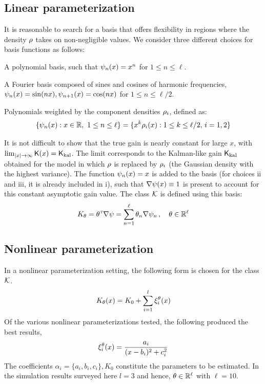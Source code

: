 \subsection*{Linear parameterization}
\label{s:linear_param}
It is reasonable to search for a basis that offers flexibility in regions where the density $\rho$ takes on non-negligible values. We consider three different choices for basis functions as follows:
\begin{romannum}
\item A polynomial basis, such that $\psi_n(x) = x^n$ for $1 \leq n \leq \ell$.
\item A Fourier basis composed of sines and cosines of harmonic frequencies, $\psi_n(x) = \sin(n x), \psi_{n+1}(x) = \cos(n x)$ for $1 \leq n \leq \ell/2$.
\item Polynomials weighted by the component densities $\rho_i$, defined as: 
\begin{equation}
\{\basis_n(x) : x\in\Re,\ 1\le n\le \ell\}  = \{ x^k \pr_i(x) :  1\le k \le \ell/2, \,  i=1,2\}
\label{e:wt_polynomial_basis}
\end{equation}
\end{romannum}
It is not difficult to show that the true gain is nearly constant for large $x$, with $\lim_{|x|\to\infty} \text{\sf K}(x) = \sf K_{\text{kal}}$. The limit corresponds to the Kalman-like gain $\sf K_{\text{kal}}$ obtained for the model in which $\rho$ is replaced by $\rho_i$  (the Gaussian density with the highest variance). The function $\psi_n(x) = x$ is added to the basis (for choices ii and iii, it is already included in i), such that $\nabla \psi(x)\equiv 1$ is present to account for this constant asymptotic gain value. The class ${\cal K}$ is defined using this basis:
\begin{equation*}
K_\theta = \theta^{{\hbox{\tiny\it T}}}\nabla \psi = \sum_{n=1}^{\ell}\theta_{n}\nabla \psi_{n}\,, \quad\theta\in\mathbb{R}^{\ell}
\end{equation*}

\subsection*{Nonlinear parameterization}
\label{s:nl_param}
In a nonlinear parameterization setting, the following form is chosen for the class ${\cal K}$.
\begin{equation*}
K_\theta(x) = K_{0} + \sum_{i=1}^{l} \xi_{i}^{\theta}(x)
\end{equation*}
Of the various nonlinear parameterizations tested, the following produced the best results,
\begin{equation*}
\xi_{i}^{\theta}(x) = \dfrac{a_{i}}{(x -b_{i})^2 + c_{i}^2}
\end{equation*}
The coefficients $\alpha_i  = \{a_i, b_i, c_i \}, K_0$ constitute the parameters to be estimated.
In the simulation results surveyed here  $l=3$ and hence, $\theta \in \mathbb{R}^{\ell}$ with $\ell=10$.

